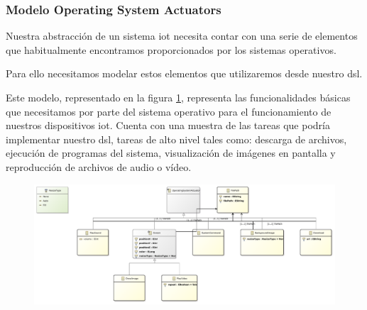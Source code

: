 \subsubsection{Modelo Operating System Actuators}

Nuestra abstracción de un sistema \gls{iot} necesita contar con una serie de elementos que habitualmente encontramos proporcionados por los sistemas operativos.

Para ello necesitamos modelar estos elementos que utilizaremos desde nuestro \gls{dsl}.

Este modelo, representado en la figura  \ref{fig:modelo_operatingsystemactuators_classes}, representa las funcionalidades básicas que necesitamos por parte del sistema operativo para el funcionamiento de nuestros dispositivos \gls{iot}. Cuenta con una muestra de las tareas que podría implementar nuestro \gls{dsl}, tareas de alto nivel tales como: descarga de archivos, ejecución de programas del sistema, visualización de imágenes en pantalla y reproducción de archivos de audio o vídeo.

\begin{figure}[htp]
	\centering
    \includegraphics[height=0.3\textheight]{images/models/operatingsystemactuators_class_diagram.pdf}
    \label{fig:modelo_operatingsystemactuators_classes}
\end{figure}
